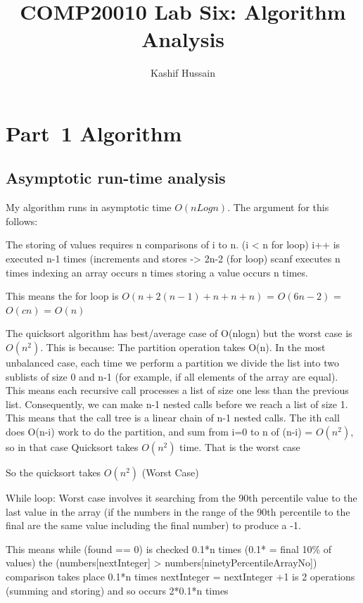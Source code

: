 \documentclass{article}
\title{COMP20010 Lab Six: Algorithm Analysis}
\author{Kashif Hussain}
\begin{document}
\maketitle


\section{Part~1 Algorithm}
\label{sec:algorithm1}

\subsection{Asymptotic run-time analysis}

My algorithm runs in asymptotic time $O(nLogn)$. The argument for this follows:

The storing of values requires n comparisons of i to n. (i < n for loop)
i++ is executed n-1 times (increments and stores -> 2n-2 (for loop)
scanf executes n times
indexing an array occurs n times
storing a value occurs n times.

This means the for loop is $O(n + 2(n-1) + n + n + n)$ = $O(6n-2)$ = $O(cn)$ = $O(n)$

The quicksort algorithm has best/average case of O(nlogn) but the worst case is
$O(n^2)$.
This is because:
The partition operation takes O(n).
In the most unbalanced case, each time we perform a partition we divide the 
list into two sublists of size 0 and n-1 
(for example, if all elements of the array are equal). 
This means each recursive call processes a list of size one less than the 
previous list. Consequently, we can make n-1 nested calls before we reach a 
list of size 1. This means that the call tree is a linear chain of n-1 nested
calls. The ith call does O(n-i) work to do the partition, and
sum from i=0 to n of (n-i) = $O(n^2)$, so in that case Quicksort takes 
$O(n^2)$ time. That is the worst case

So the quicksort takes $O(n^2)$ (Worst Case)

While loop:
Worst case involves it searching from the 90th percentile value to the last
value in the array (if the numbers in the range of the 90th percentile to the 
final are the same value including the final number) to produce a -1.

This means while (found == 0) is checked 0.1*n times 
(0.1* = final 10\% of values)
the (numbers[nextInteger] > numbers[ninetyPercentileArrayNo]) comparison takes
place 0.1*n times
nextInteger = nextInteger +1 is 2 operations (summing and storing) and so occurs
2*0.1*n times
\end{document}
